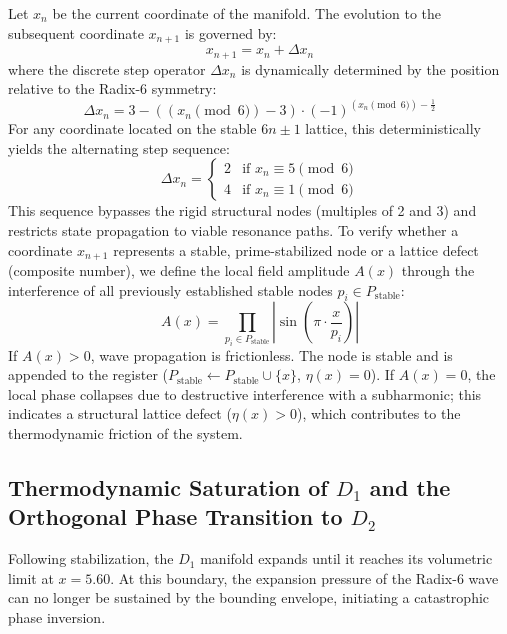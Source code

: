 \documentclass[11pt,a4paper]{article}
\theoremstyle{plain}
\theoremstyle{definition}
\theoremstyle{remark}
\begin{document}
Let $x_n$ be the current coordinate of the manifold. The evolution to the subsequent coordinate $x_{n+1}$ is governed by:
\begin{equation}
x_{n+1} = x_n + \Delta x_n
\end{equation}
where the discrete step operator $\Delta x_n$ is dynamically determined by the position relative to the Radix-6 symmetry:
\begin{equation}
\Delta x_n = 3 - ((x_n \pmod 6) - 3) \cdot (-1)^{(x_n \pmod 6) - \frac{1}{2}}
\end{equation}
For any coordinate located on the stable $6n \pm 1$ lattice, this deterministically yields the alternating step sequence:
\begin{equation}
\Delta x_n = \begin{cases} 2 & \text{if } x_n \equiv 5 \pmod 6 \\ 4 & \text{if } x_n \equiv 1 \pmod 6 \end{cases}
\end{equation}
This sequence bypasses the rigid structural nodes (multiples of 2 and 3) and restricts state propagation to viable resonance paths. To verify whether a coordinate $x_{n+1}$ represents a stable, prime-stabilized node or a lattice defect (composite number), we define the local field amplitude $A(x)$ through the interference of all previously established stable nodes $p_i \in P_{\text{stable}}$:
\begin{equation}
A(x) = \prod_{p_i \in P_{\text{stable}}} \left| \sin\left(\pi \cdot \frac{x}{p_i}\right) \right|
\end{equation}
If $A(x) > 0$, wave propagation is frictionless. The node is stable and is appended to the register ($P_{\text{stable}} \leftarrow P_{\text{stable}} \cup \{x\}$, $\eta(x)=0$). If $A(x) = 0$, the local phase collapses due to destructive interference with a subharmonic; this indicates a structural lattice defect ($\eta(x) > 0$), which contributes to the thermodynamic friction of the system.

\subsection{Thermodynamic Saturation of $D_1$ and the Orthogonal Phase Transition to $D_2$}
Following stabilization, the $D_1$ manifold expands until it reaches its volumetric limit at $x = 5.60$. At this boundary, the expansion pressure of the Radix-6 wave can no longer be sustained by the bounding envelope, initiating a catastrophic phase inversion.
\end{document}
